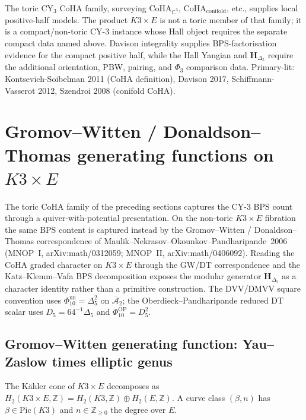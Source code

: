 \begin{remark}
\label{rem:tcy3-phi-arrow-opener}
The toric CY$_3$ CoHA family, surveying $\mathrm{CoHA}_{\mathbb C^3}$,
$\mathrm{CoHA}_{\mathrm{conifold}}$, etc., supplies local positive-half
models. The product $K3\times E$ is not a toric member of that family;
it is a compact/non-toric CY-$3$ instance whose Hall object requires
the separate compact data named above. Davison integrality supplies
BPS-factorisation evidence for the compact positive half, while the
Hall Yangian and $\mathbf H_{\Delta_5}$ require the additional
orientation, PBW, pairing, and $\Phi_3$ comparison data.
Primary-lit: Kontsevich-Soibelman 2011 ($\mathrm{CoHA}$ definition),
Davison 2017, Schiffmann-Vasserot 2012, Szendroi 2008 (conifold CoHA).
\end{remark}

\section{Gromov--Witten / Donaldson--Thomas generating functions on \texorpdfstring{$K3 \times E$}{K3 x E}}
\label{sec:tcy3-gwdt-K3xE}

The toric CoHA family of the preceding sections captures the CY-$3$
BPS count through a quiver-with-potential presentation. On the
non-toric $K3 \times E$ fibration the same BPS content is captured
instead by the Gromov--Witten / Donaldson--Thomas correspondence of
Maulik--Nekrasov--Okounkov--Pandharipande~2006 (MNOP~I,
arXiv:math/0312059; MNOP~II, arXiv:math/0406092). Reading the CoHA
graded character on $K3 \times E$ through the GW/DT correspondence and
the Katz--Klemm--Vafa BPS decomposition exposes the modular
generator $\mathbf{H}_{\Delta_5}$ as a character identity rather
than a primitive construction. The DVV/DMVV square convention uses
\(\Phi_{10}^{\mathrm{un}}=\Delta_5^2\) on
\(\overline{\mathcal A}_2\); the Oberdieck--Pandharipande reduced
DT scalar uses \(D_5=64^{-1}\Delta_5\) and
\(\Phi_{10}^{\mathrm{OP}}=D_5^2\).

\subsection{Gromov--Witten generating function: Yau--Zaslow times
elliptic genus}
\label{subsec:K3xE-gw}

The K\"ahler cone of $K3 \times E$ decomposes as $H_2(K3 \times E,
\mathbb Z) = H_2(K3, \mathbb Z) \oplus H_2(E, \mathbb Z)$. A curve
class $(\beta, n)$ has $\beta \in \mathrm{Pic}(K3)$ and $n \in \mathbb Z_{\geq 0}$
the degree over $E$.

